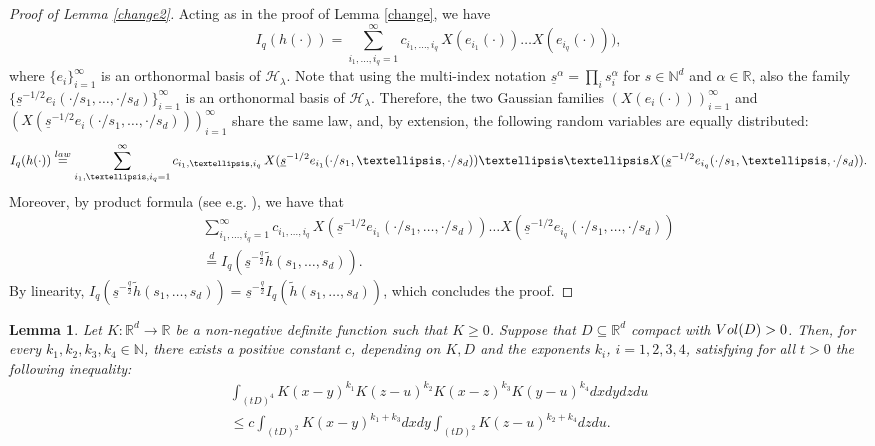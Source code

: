 \documentclass[12pt]{article}
\DeclareMathOperator{\1}{1}
\newcommand{\R}{\mathbb{R}}
\newcommand{\os}[2]{\overset{#1}{#2}}
\theoremstyle{plain}
\newtheorem{lemma}[theorem]{Lemma}
\theoremstyle{definition}
\begin{document}
 \begin{proof}[Proof of Lemma \ref{change2}]
     Acting as in the proof of Lemma \ref{change}, we have
     \[
    I_{q}(h(\cdot))=\sum_{i_1,\dots,i_q=1}^\infty c_{i_1,\dots,i_q} \,X(e_{i_1}( \cdot)) \dots  X(e_{i_q}( \cdot))),
    \]
    where $\{e_i\}_{i=1}^\infty$ is an orthonormal basis of $\mathcal{H}_\lambda$. Note that using the multi-index notation $\underline s^{\alpha} = \prod_i s_i^{\alpha}$ for $s\in \mathbb N^d$ and $\alpha\in \R$, also the family $\{\underline{s}^{-1/2}e_i(\cdot/s_1,\dots,\cdot/s_d)\}_{i=1}^\infty$ is an orthonormal basis of $\mathcal{H}_\lambda$. Therefore, the two Gaussian families $(X(e_i(\cdot)))_{i=1}^\infty$ and $(X(\underline{s}^{-1/2}e_i(\cdot/s_1,\dots,\cdot/s_d)))_{i=1}^\infty$ share the same law, and, by extension, the following random variables are equally distributed: \begin{equation}
    I_{q}(h(\cdot))\os{\rm law}{=}\sum_{i_1,\dots,i_q=1}^\infty c_{i_1,\dots,i_q} \,X(\underline{s}^{-1/2}e_{i_1}( \cdot/s_{1},\dots,\cdot/s_d)) \dots \\ \dots  X(\underline{s}^{-1/2}e_{i_q}( \cdot/s_{1},\dots,\cdot/s_d)).
    \end{equation}
    Moreover, by product formula (see e.g. \cite{bluebook}), we have that
    \begin{multline}
        \sum_{i_1, \dots, i_q=1}^\infty  c_{i_1,\dots,i_q}  \,X(\underline{s}^{-1/2}e_{i_1}( \cdot/s_{1},\dots,\cdot/s_d)) \dots  X(\underline{s}^{-1/2}e_{i_q}(\cdot/s_{1},\dots,\cdot/s_d)) \\
    \overset{d}{=}I_{q}(\underline{s}^{-\frac{q}{2}}\tilde h(s_1,\ldots,s_d)).
    \end{multline}
    By linearity, $I_{q}(\underline{s}^{-\frac{q}{2}}\tilde h(s_1,\ldots,s_d))=\underline{s}^{-\frac{q}{2}}I_{q}(\tilde h(s_1,\ldots,s_d))$, which concludes the proof.
 \end{proof} 
 
\begin{lemma} \label{lem:bound contr} Let $K:\R^d\rightarrow \R$ be a non-negative definite function such that $K\ge0$. Suppose that $D\subseteq\R^d$ compact with ${\rm Vol}(D)>0$. Then, for every $k_1,k_2,k_3,k_4\in \mathbb N$, there exists a positive constant $c$, depending on $K, D$ and the exponents $k_i$, $i=1,2,3,4$, satisfying for all $t>0$ the following inequality: 
    \begin{multline}\label{equ:lemmabound}
        \int_{(tD)^4} K(x-y)^{k_1} K(z-u)^{k_2}K(x-z)^{k_3} K(y-u)^{k_4} dx  dy  dz  du \\
        \le c \int_{(tD)^2}K(x-y)^{k_1+k_3}dxdy \int_{(tD)^2}K(z-u)^{k_2+k_4}dzdu.
    \end{multline}
\end{lemma}
\end{document}
